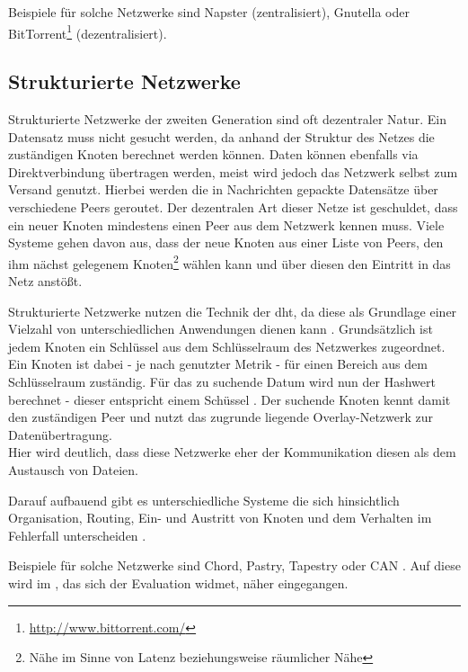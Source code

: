 Beispiele für solche Netzwerke sind Napster (zentralisiert), Gnutella oder BitTorrent\footnote{\url{http://www.bittorrent.com/}} (dezentralisiert).

\subsection{Strukturierte Netzwerke}
Strukturierte Netzwerke der zweiten Generation sind oft dezentraler Natur. Ein Datensatz muss nicht gesucht werden, da anhand der Struktur des Netzes die zuständigen Knoten berechnet werden können. Daten können ebenfalls via Direktverbindung übertragen werden, meist wird jedoch das Netzwerk selbst zum Versand genutzt. Hierbei werden die in Nachrichten gepackte Datensätze über verschiedene Peers geroutet. Der dezentralen Art dieser Netze ist geschuldet, dass ein neuer Knoten mindestens einen Peer aus dem Netzwerk kennen muss. Viele Systeme gehen davon aus, dass der neue Knoten aus einer Liste von Peers, den ihm nächst gelegenem Knoten\footnote{Nähe im Sinne von Latenz beziehungsweise räumlicher Nähe} wählen kann und über diesen den Eintritt in das Netz anstößt.

Strukturierte Netzwerke nutzen die Technik der \ac{dht}, da diese als Grundlage einer Vielzahl von unterschiedlichen Anwendungen dienen kann \cite{Wehrle2005, Ghodsi2006AlgorithmsDHT}. Grundsätzlich ist jedem Knoten ein Schlüssel aus dem Schlüsselraum des Netzwerkes zugeordnet. Ein Knoten ist dabei - je nach genutzter Metrik - für einen Bereich aus dem Schlüsselraum zuständig. Für das zu suchende Datum wird nun der Hashwert berechnet - dieser entspricht einem Schüssel \cite{BalakrishnanLooking}. Der suchende Knoten kennt damit den zuständigen Peer und nutzt das zugrunde liegende Overlay-Netzwerk zur Datenübertragung.\\
Hier wird deutlich, dass diese Netzwerke eher der Kommunikation diesen als dem Austausch von Dateien.

Darauf aufbauend gibt es unterschiedliche Systeme die sich hinsichtlich Organisation, Routing, Ein- und Austritt von Knoten und dem Verhalten im Fehlerfall unterscheiden \cite{Goetz2005, Lua2005Survey}.

Beispiele für solche Netzwerke sind Chord, Pastry, Tapestry oder CAN \cite{Hosseini2007Survey, Rowstron2001, Zhao2001Tapestry,Zhao2004Tapestry, Ratnasamy2001Scalable}. Auf diese wird im , das sich der Evaluation widmet, näher eingegangen.
